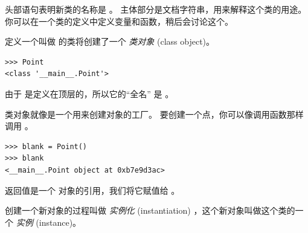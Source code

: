 %

头部语句表明新类的名称是  。
主体部分是文档字符串，用来解释这个类的用途。
你可以在一个类的定义中定义变量和函数，稍后会讨论这个。

    


定义一个叫做  的类将创建了一个 {\em 类对象} (class object)。

\begin{lstlisting}
>>> Point
<class '__main__.Point'>
\end{lstlisting}

%

由于  是定义在顶层的，所以它的``全名'' 是  。

  


类对象就像是一个用来创建对象的工厂。
要创建一个点，你可以像调用函数那样调用  。

\begin{lstlisting}
>>> blank = Point()
>>> blank
<__main__.Point object at 0xb7e9d3ac>
\end{lstlisting}

%

返回值是一个  对象的引用，我们将它赋值给  。


创建一个新对象的过程叫做 {\em 实例化} (instantiation) ，这个新对象叫做这个类的一个 {\em 实例} (instance)。

  


